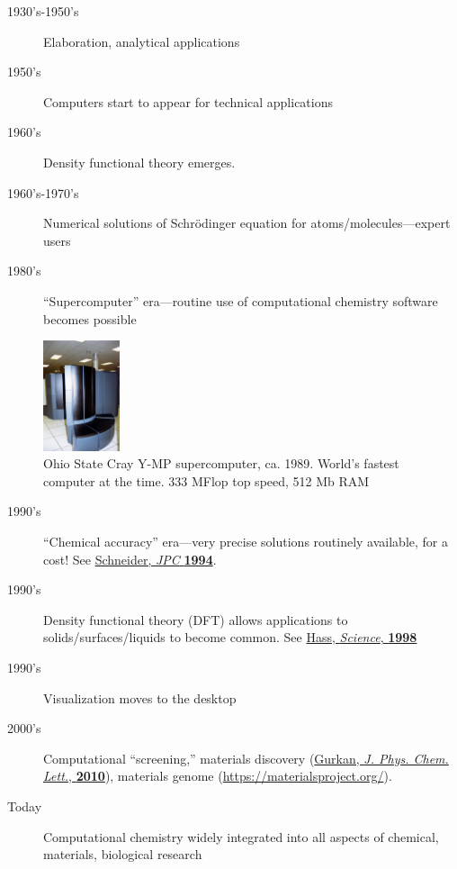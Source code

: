 \documentclass[11pt]{article}
\begin{document}
\begin{description}
\item[{1930's-1950's}] Elaboration, analytical applications

\item[{1950's}] Computers start to appear for technical applications

\item[{1960's}] Density functional theory emerges.

\item[{1960's-1970's}] Numerical solutions of Schr\"{o}dinger equation for atoms/molecules---expert users

\item[{1980's}] ``Supercomputer'' era---routine use of computational chemistry software becomes possible
\end{description}
\begin{figure}[htbp]
\centering
\includegraphics[width=0.2\textwidth]{./Images/CrayYMPb.jpg}
\caption{Ohio State Cray Y-MP supercomputer, ca. 1989.  World's fastest computer at the time.  333 MFlop top speed, 512 Mb RAM}
\end{figure}

\begin{description}
\item[{1990's}] ``Chemical accuracy'' era---very precise solutions routinely available, for a cost!  See \href{./Resources/1994\_WFS\_JPC.pdf}{Schneider, \emph{JPC} \textbf{1994}}.

\item[{1990's}] Density functional theory (DFT) allows applications to solids/surfaces/liquids to become common. See \href{./Resources/1998\_Hass\_Science.pdf}{Hass, \emph{Science}, \textbf{1998}}

\item[{1990's}] Visualization moves to the desktop

\item[{2000's}] Computational ``screening,'' materials discovery (\href{http://www.crc.nd.edu/\~wschnei1/courses/CBE\_547/Resources/2010\_Gurkan\_JPCL.pdf}{Gurkan, \emph{J. Phys. Chem. Lett.}, \textbf{2010}}), materials genome (\url{https://materialsproject.org/}).

\item[{Today}] Computational chemistry widely integrated into all aspects of chemical, materials, biological research
\end{description}
\end{document}
